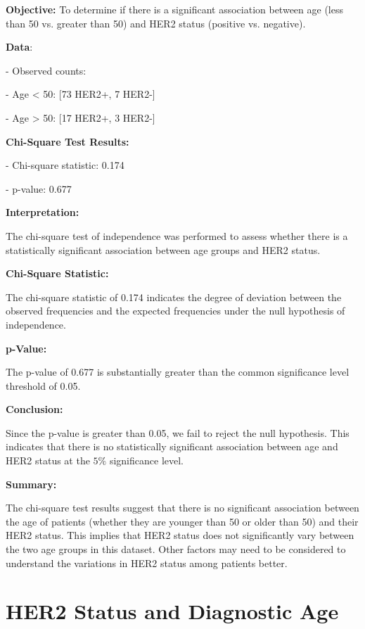 \documentclass[12 px]{article}
\begin{document}
\textbf{Objective:} To determine if there is a significant association between age 
          (less than 50 vs. greater than 50) and HER2 status (positive vs. negative).
          
          
\textbf{Data}:

- Observed counts:

  - Age < 50: [73 HER2+, 7 HER2-]
  
  - Age > 50: [17 HER2+, 3 HER2-]
  

\textbf{Chi-Square Test Results:}

- Chi-square statistic: 0.174

- p-value: 0.677

\textbf{Interpretation:}

The chi-square test of independence was performed to assess whether there 
is a statistically significant association between age groups and HER2 status.

\textbf{Chi-Square Statistic:}

The chi-square statistic of 0.174 indicates the degree of deviation between the observed frequencies and the expected frequencies under the null hypothesis of independence.


\textbf{p-Value:}
 
The p-value of 0.677 is substantially greater than the common significance level threshold of 0.05.

\textbf{Conclusion:}

Since the p-value is greater than 0.05, we fail to reject the null hypothesis. 
            This indicates that there is no statistically significant association between
            age and HER2 status at the $5\%$ significance level.
            
\textbf{Summary:}

The chi-square test results suggest that there is no significant association between 
the age of patients (whether they are younger than 50 or older than 50) and their 
HER2 status. This implies that HER2 status does not significantly vary between 
the two age groups in this dataset. Other factors may need to be considered 
to understand the variations in HER2 status among patients better.






\section*{HER2 Status and Diagnostic Age}
\end{document}
